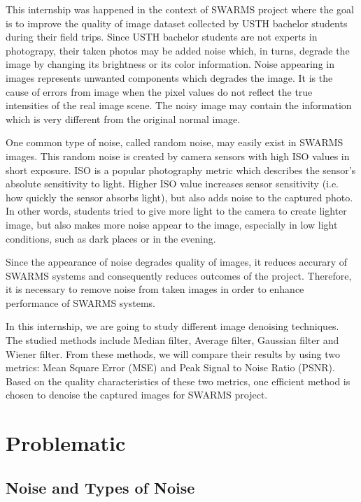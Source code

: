 This internship was happened in the context of SWARMS project where the goal is to improve the quality of image dataset collected by USTH bachelor students during their field trips. Since USTH bachelor students are not experts in photograpy, their taken photos may be added noise which, in turns, degrade the image by changing its brightness or its color information. Noise appearing in images represents unwanted components which degrades the image. It is the cause of errors from image when the pixel values do not reflect the true intensities of the real image scene. The noisy image may contain the information which is very different from the original normal image. 

One common type of noise, called random noise, may easily exist in SWARMS images. This random noise is created by camera sensors with high ISO values in short exposure. ISO is a popular photography metric which describes the sensor's absolute sensitivity to light. Higher ISO value increases sensor sensitivity (i.e. how quickly the sensor absorbs light), but also adds noise to the captured photo. In other words, students tried to give more light to the camera to create lighter image, but also makes more noise appear to the image, especially in low light conditions, such as dark places or in the evening.

Since the appearance of noise degrades quality of images, it reduces accurary of SWARMS systems and consequently reduces outcomes of the project. Therefore, it is necessary to remove noise from taken images in order to enhance performance of SWARMS systems. 

In this internship, we are going to study different image denoising techniques. The studied methods include Median filter, Average filter, Gaussian filter and Wiener filter. From these methods, we will compare their results by using two metrics: Mean Square Error (MSE) and Peak Signal to Noise Ratio (PSNR). Based on the quality characteristics of these two metrics, one efficient method is chosen to denoise the captured images for SWARMS project.

\section{Problematic}

\subsection{Noise and Types of Noise}


